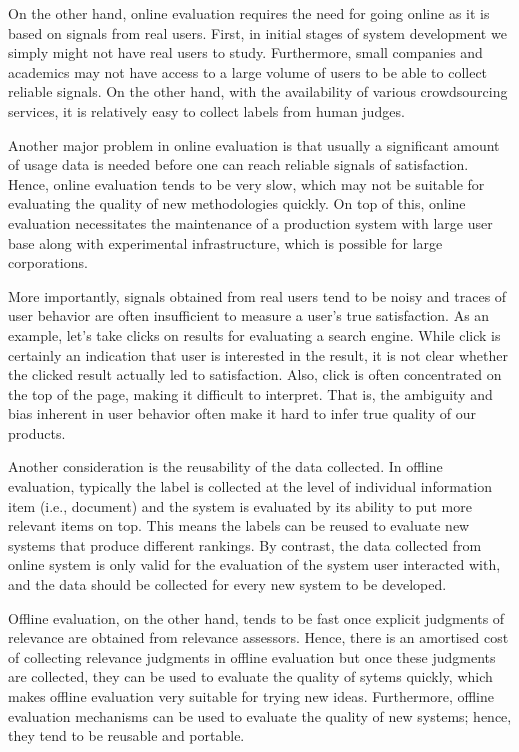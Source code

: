 On the other hand, online evaluation requires the need for going online as it is based on signals from real users. First, in initial stages of system development we simply might not have real users to study. Furthermore, small companies and academics may not have access to a large volume of users to be able to collect reliable signals. On the other hand, with the availability of various crowdsourcing services, it is relatively easy to collect labels from human judges.

Another major problem in online evaluation is that usually a significant amount of usage data is needed before one can reach reliable signals of satisfaction. Hence, online evaluation tends to be very slow, which may not be suitable for evaluating the quality of new methodologies quickly. On top of this, online evaluation necessitates the maintenance of a production system with large user base along with experimental infrastructure, which is possible for large corporations.

More importantly, signals obtained from real users tend to be noisy and traces of user behavior are often insufficient to measure a user's true satisfaction. As an example, let's take clicks on results for evaluating a search engine. While click is certainly an indication that user is interested in the result, it is not clear whether the clicked result actually led to satisfaction. Also, click is often concentrated on the top of the page, making it difficult to interpret. That is, the ambiguity and bias inherent in user behavior often make it hard to infer true quality of our products. 

Another consideration is the reusability of the data collected. In offline evaluation, typically the label is collected at the level of individual information item (i.e., document) and the system is evaluated by its ability to put more relevant items on top. This means the labels can be reused to evaluate new systems that produce different rankings. By contrast, the data collected from online system is only valid for the evaluation of the system user interacted with, and the data should be collected for every new system to be developed.

Offline evaluation, on the other hand, tends to be fast once explicit judgments of relevance are obtained from relevance assessors. Hence, there is an amortised cost of collecting relevance judgments in offline evaluation but once these judgments are collected, they can be used to evaluate the quality of sytems quickly, which makes offline evaluation very suitable for trying new ideas. Furthermore, offline evaluation mechanisms can be used to evaluate the quality of new systems; hence, they tend to be reusable and portable. 

